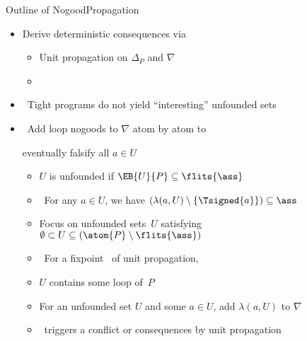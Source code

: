 \begin{frame}{Outline of {NogoodPropagation}}
  \smallskip
  \begin{itemize}
  \item Derive deterministic consequences via
    \begin{itemize}\normalsize
    \item Unit propagation on $\Delta_P$ and $\nabla$
    \item \alert<4->{}
    \end{itemize}
    \smallskip
  \item<only@2-3>  \ Tight programs do not yield ``interesting'' unfounded sets
    \medskip
  \item<5->  \ Add loop nogoods to $\nabla$ atom by atom to
    \par
    eventually falsify all $a\in U$
    \medskip
    \begin{itemize}\normalsize
  \item<6-> $U$ is \alert{unfounded} if $\EB{U}{P}\subseteq\flits{\ass}$
  \item<7->[] \itarrow\ For any $a\in U$, we have $(\lambda(a,U)\setminus\{\Tsigned{a}\})\subseteq\ass$
    \smallskip
  \item<8-> Focus on unfounded sets~$U$ satisfying $\emptyset\subset U \subseteq (\atom{P}\setminus\flits{\ass})$
  \item<9->[] \itarrow\ For a fixpoint \ass\ of unit propagation,
  \item<9->[]\phantom{\itarrow}  $U$ contains some loop of~$P$
    \smallskip
  \item<10-> For an unfounded set $U$ and some $a\in U$, add $\lambda(a,U)$ to $\nabla$
  \item<11->[] \itarrow\ triggers a conflict or consequences by unit propagation
  \end{itemize}
\end{itemize}
\end{frame}
\begin{frame}[shrink=24]

\end{frame}
